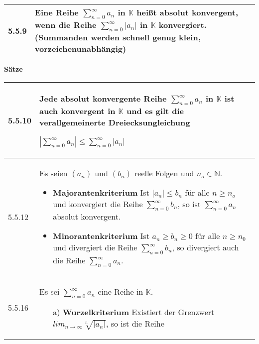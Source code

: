    \begin{longtable}{p{1cm} p{16cm}}
        \toprule

        5.5.9 & Eine Reihe $\sum^{\infty}_{n=0} a_n$ in $\mathbb{K}$ heißt \textbf{absolut konvergent}, wenn die Reihe
                $\sum^{\infty}_{n=0} |a_n|$ in $\mathbb{K}$ konvergiert. (Summanden werden schnell genug klein, vorzeichenunabhängig)\\

        \bottomrule

    \end{longtable}
    

    \noindent 
    \textbf{Sätze}
    
    \begin{longtable}{p{1cm} p{16cm}}
        \toprule

        5.5.10& Jede absolut konvergente Reihe $\sum^{\infty}_{n=0} a_n$ in $\mathbb{K}$ ist auch konvergent in $\mathbb{K}$ und es
                gilt die verallgemeinerte Dreiecksungleichung \hfill \break
                \centerline{$|\sum^{\infty}_{n=0}a_n| \leq \sum^{\infty}_{n=0} |a_n|$} \\
        \midrule
        5.5.12& Es seien $(a_n)$ und $(b_n)$ reelle Folgen und $n_o \in \mathbb{N}$.
                \begin{itemize}[topsep=-0.5cm]
                    \item \textbf{Majorantenkriterium} \hfill \break 
                            Ist $|a_n| \leq b_n$ für alle $n \geq n_o$ und konvergiert die Reihe $\sum^{\infty}_{n=0}b_n$, so ist
                            $\sum^{\infty}_{n=0} a_n$ absolut konvergent.
                    \item \textbf{Minorantenkriterium} \hfill \break
                            Ist $a_n \geq b_n \geq 0$ für alle $n \geq n_0$ und divergiert die Reihe $\sum^{\infty}_{n=0}b_n$, so 
                            divergiert auch die Reihe $\sum^{\infty}_{n=0}a_n$. 
                \end{itemize} \vspace{-0cm} \\
        \midrule
        5.5.16& Es sei $\sum^{\infty}_{n=0}a_n$ eine Reihe in $\mathbb{K}$.
                \begin{itemize}[topsep=-0.5cm]
                    \item[a)] \textbf{Wurzelkriterium} \hfill \break
                            Existiert der Grenzwert $lim_{n \rightarrow \infty} \sqrt[n]{|a_n|}$, so ist die Reihe
                            \begin{itemize}[topsep=-0.5cm]

\end{itemize}
\end{itemize}
\end{longtable}
